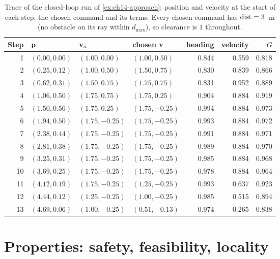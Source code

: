 \begin{table}[tb]
  \centering\small
  \caption{Trace of the closed-loop run of \cref{ex:ch14-approach}: position
  and velocity at the start of each step, the chosen command and its terms.
  Every chosen command has $\operatorname{dist} = 3$~m (no obstacle on its ray within
  $d_{\max}$), so clearance is $1$ throughout.}
  \label{tab:ch14-trace}
  \begin{tabular}{@{}rlllrrr@{}}
  \toprule
  Step & $\mathbf{p}$ & $\mathbf{v}_a$ & chosen $\mathbf{v}$ & heading & velocity & $G$\\
  \midrule
  1 & $(0.00, 0.00)$ & $(1.00, 0.00)$ & $(1.00, 0.50)$ & 0.844 & 0.559 & 0.818\\
  2 & $(0.25, 0.12)$ & $(1.00, 0.50)$ & $(1.50, 0.75)$ & 0.830 & 0.839 & 0.866\\
  3 & $(0.62, 0.31)$ & $(1.50, 0.75)$ & $(1.75, 0.75)$ & 0.831 & 0.952 & 0.889\\
  4 & $(1.06, 0.50)$ & $(1.75, 0.75)$ & $(1.75, 0.25)$ & 0.904 & 0.884 & 0.919\\
  5 & $(1.50, 0.56)$ & $(1.75, 0.25)$ & $(1.75, -0.25)$ & 0.994 & 0.884 & 0.973\\
  6 & $(1.94, 0.50)$ & $(1.75, -0.25)$ & $(1.75, -0.25)$ & 0.993 & 0.884 & 0.972\\
  7 & $(2.38, 0.44)$ & $(1.75, -0.25)$ & $(1.75, -0.25)$ & 0.991 & 0.884 & 0.971\\
  8 & $(2.81, 0.38)$ & $(1.75, -0.25)$ & $(1.75, -0.25)$ & 0.989 & 0.884 & 0.970\\
  9 & $(3.25, 0.31)$ & $(1.75, -0.25)$ & $(1.75, -0.25)$ & 0.985 & 0.884 & 0.968\\
  10 & $(3.69, 0.25)$ & $(1.75, -0.25)$ & $(1.75, -0.25)$ & 0.978 & 0.884 & 0.964\\
  11 & $(4.12, 0.19)$ & $(1.75, -0.25)$ & $(1.25, -0.25)$ & 0.993 & 0.637 & 0.923\\
  12 & $(4.44, 0.12)$ & $(1.25, -0.25)$ & $(1.00, -0.25)$ & 0.985 & 0.515 & 0.894\\
  13 & $(4.69, 0.06)$ & $(1.00, -0.25)$ & $(0.51, -0.13)$ & 0.974 & 0.265 & 0.838\\
  \bottomrule
  \end{tabular}
\end{table}

\section{Properties: safety, feasibility, locality}
\label{sec:ch14-properties}

